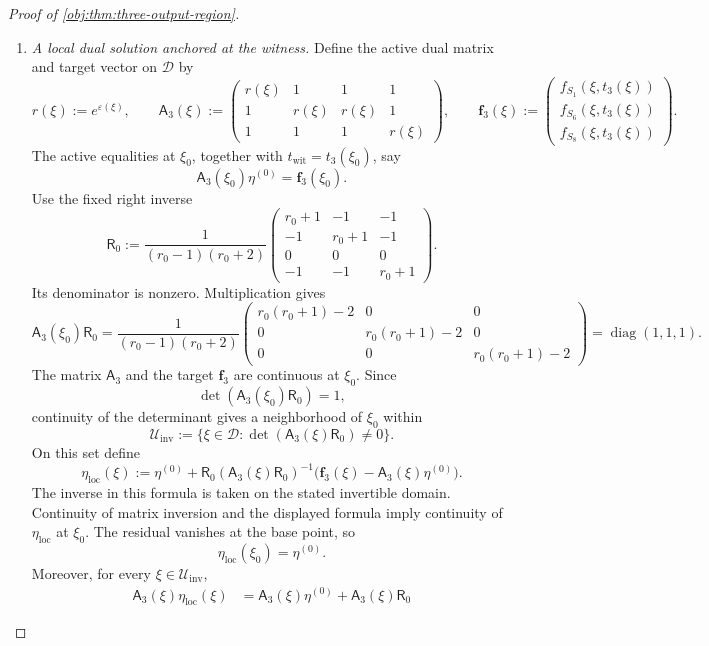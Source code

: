 \begin{proof}[Proof of \cref{obj:thm:three-output-region}]
\begin{enumerate}
\item \textit{A local dual solution anchored at the witness.}
Define the active dual matrix and target vector on \(\mathcal D\) by
\[
r(\xi):=e^{\varepsilon(\xi)},
\qquad
\mathsf A_3(\xi):=
\begin{pmatrix}
r(\xi)&1&1&1\\
1&r(\xi)&r(\xi)&1\\
1&1&1&r(\xi)
\end{pmatrix},
\qquad
\boldsymbol f_3(\xi):=
\begin{pmatrix}
f_{S_1}(\xi,t_3(\xi))\\
f_{S_6}(\xi,t_3(\xi))\\
f_{S_8}(\xi,t_3(\xi))
\end{pmatrix}.
\]
The active equalities at \(\xi_0\), together with
\(t_{\mathrm{wit}}=t_3(\xi_0)\), say
\[
\mathsf A_3(\xi_0)\eta^{(0)}=\boldsymbol f_3(\xi_0).
\]
Use the fixed right inverse
\[
\mathsf R_0:=
\frac{1}{(r_0-1)(r_0+2)}
\begin{pmatrix}
r_0+1&-1&-1\\
-1&r_0+1&-1\\
0&0&0\\
-1&-1&r_0+1
\end{pmatrix}.
\]
Its denominator is nonzero. Multiplication gives
\[
\mathsf A_3(\xi_0)\mathsf R_0
=
\frac{1}{(r_0-1)(r_0+2)}
\begin{pmatrix}
r_0(r_0+1)-2&0&0\\
0&r_0(r_0+1)-2&0\\
0&0&r_0(r_0+1)-2
\end{pmatrix}
=\operatorname{diag}(1,1,1).
\]
The matrix \(\mathsf A_3\) and the target \(\boldsymbol f_3\) are continuous at \(\xi_0\). Since
\[
\det(\mathsf A_3(\xi_0)\mathsf R_0)=1,
\]
continuity of the determinant gives a neighborhood of \(\xi_0\) within
\[
\mathcal U_{\mathrm{inv}}
:=
\{\xi\in\mathcal D:
\det(\mathsf A_3(\xi)\mathsf R_0)\ne0\}.
\]
On this set define
\[
\eta_{\mathrm{loc}}(\xi):=
\eta^{(0)}
+
\mathsf R_0
(\mathsf A_3(\xi)\mathsf R_0)^{-1}
\bigl(\boldsymbol f_3(\xi)-\mathsf A_3(\xi)\eta^{(0)}\bigr).
\]
The inverse in this formula is taken on the stated invertible domain. Continuity of matrix inversion and the displayed formula imply continuity of \(\eta_{\mathrm{loc}}\) at \(\xi_0\). The residual vanishes at the base point, so
\[
\eta_{\mathrm{loc}}(\xi_0)=\eta^{(0)}.
\]
Moreover, for every \(\xi\in\mathcal U_{\mathrm{inv}}\),
\[
\begin{aligned}
\mathsf A_3(\xi)\eta_{\mathrm{loc}}(\xi)
&=
\mathsf A_3(\xi)\eta^{(0)}
+
\mathsf A_3(\xi)\mathsf R_0

\end{aligned}\]
\end{enumerate}
\end{proof}
